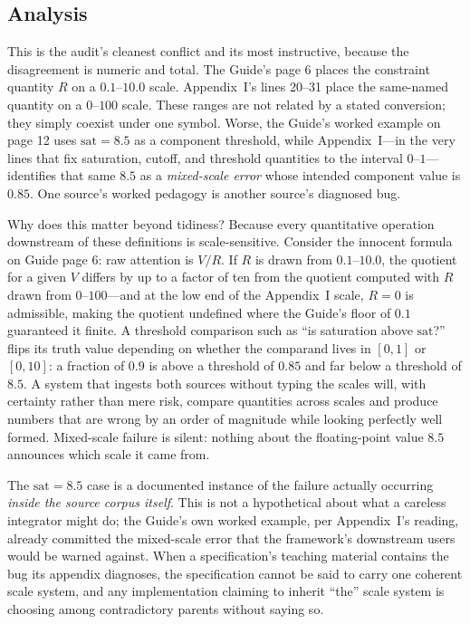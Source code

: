 \subsection{Analysis}

This is the audit's cleanest conflict and its most instructive, because the
disagreement is numeric and total. The Guide's page 6 places the constraint
quantity $R$ on a $0.1$--$10.0$ scale. Appendix~I's lines 20--31 place the
same-named quantity on a $0$--$100$ scale. These ranges are not related by a
stated conversion; they simply coexist under one symbol. Worse, the Guide's
worked example on page 12 uses $\mathrm{sat}=8.5$ as a component threshold,
while Appendix~I---in the very lines that fix saturation, cutoff, and
threshold quantities to the interval $0$--$1$---identifies that same $8.5$ as
a \emph{mixed-scale error} whose intended component value is $0.85$. One
source's worked pedagogy is another source's diagnosed bug.

Why does this matter beyond tidiness? Because every quantitative operation
downstream of these definitions is scale-sensitive. Consider the innocent
formula on Guide page 6: raw attention is $V/R$. If $R$ is drawn from
$0.1$--$10.0$, the quotient for a given $V$ differs by up to a factor of ten
from the quotient computed with $R$ drawn from $0$--$100$---and at the low
end of the Appendix~I scale, $R=0$ is admissible, making the quotient
undefined where the Guide's floor of $0.1$ guaranteed it finite. A threshold
comparison such as ``is saturation above $\mathrm{sat}$?'' flips its truth
value depending on whether the comparand lives in $[0,1]$ or $[0,10]$: a
fraction of $0.9$ is above a threshold of $0.85$ and far below a threshold of
$8.5$. A system that ingests both sources without typing the scales will,
with certainty rather than mere risk, compare quantities across scales and
produce numbers that are wrong by an order of magnitude while looking
perfectly well formed. Mixed-scale failure is silent: nothing about the
floating-point value $8.5$ announces which scale it came from.

The $\mathrm{sat}=8.5$ case is a documented instance of the failure actually
occurring \emph{inside the source corpus itself}. This is
not a hypothetical about what a careless integrator might do; the Guide's own
worked example, per Appendix~I's reading, already committed the mixed-scale
error that the framework's downstream users would be warned against. When a
specification's teaching material contains the bug its appendix diagnoses,
the specification cannot be said to carry one coherent scale system, and any
implementation claiming to inherit ``the'' scale system is choosing among
contradictory parents without saying so.

